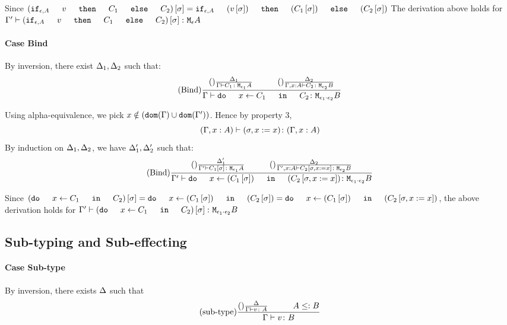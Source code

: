 {        Since $(\ifthenelse{\e}{A}{v}{C_1}{C_2})\ssi = \ifthenelse{\e}{A}{(v\ssi)}{(C_1\ssi)}{(C_2\ssi)}$ The derivation above holds for $\typerelation{\G'}{(\ifthenelse{\e}{A}{v}{C_1}{C_2})\ssi}{\mea}$

    \paragraph{Case Bind}
        By inversion, there exist $\Delta_1, \Delta_2$ such that:
        \begin{equation}
            \treerule{Bind}{
                \treerule{}{\D_1}{\typerelation{\G}{C_1}{\M{\e_1}{A}}}
                \s\s
                \treerule{}{\D_2}{\typerelation{\G, x:A}{C_2}{\M{\e_2}{B}}}
            }{\typerelation{\G}{\doin{x}{C_1}{C_2}}{\M{\e_1\dot\e_2}{B}}}
        \end{equation}

        Using alpha-equivalence, we pick $x\notin(\texttt{dom}(\Gamma)\cup\texttt{dom}(\Gamma'))$. Hence by property 3, $$(\Gamma, x: A) \vdash (\sigma, x:= x) \colon (\Gamma, x: A)$$
        By induction on $\Delta_1, \Delta_2$, we have $\Delta_1', \Delta_2'$ such that:
        \begin{equation}
            \treerule{Bind}{
                \treerule{}{\D_1'}{\typerelation{\G'}{C_1\ssi}{\M{\e_1}{A}}}
                \s\s
                \treerule{}{\D_2}{\typerelation{\G', x:A}{C_2\sub{\si, x\setto x}}{\M{\e_2}{B}}}
            }{\typerelation{\G'}{\doin{x}{(C_1\ssi)}{(C_2\sub{\si, x\setto x})}}{\M{\e_1\dot\e_2}{B}}}
        \end{equation}

        Since $(\doin{x}{C_1}{C_2})\ssi = \doin{x}{(C_1\ssi)}{(C_2\ssi)} = \doin{x}{(C_1\ssi)}{(C_2\sub{\si, x\setto x})}$, the above derivation holds for $\typerelation{\G'}{(\doin{x}{C_1}{C_2})\ssi}{\M{\e_1\dot\e_2}{B}}$
    \subsection{Sub-typing and Sub-effecting}
    \paragraph{Case Sub-type}
        By inversion, there exists $\Delta$ such that
        \begin{equation}
            \treerule{sub-type}{\treerule{}{\D}{\typerelation{\G}{v}{A}}\s\s A\subtype B}{\typerelation{\G}{v}{B}}
        \end{equation}

}
